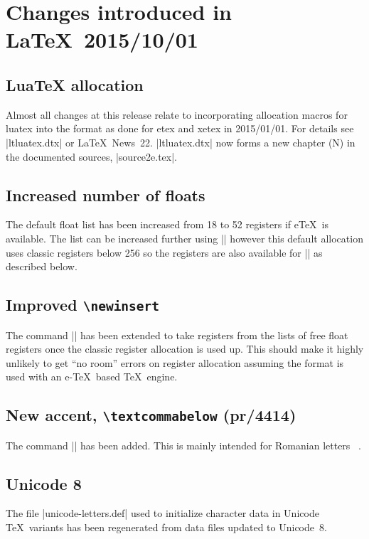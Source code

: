 \documentclass{ltxguide}
\newcommand\ltnewsissue[1]{\LaTeX\ News~#1}
\newcommand\ltnewsissue[1]{%
    \href{https://www.latex-project.org/news/latex2e-news/ltnews#1.pdf}{\LaTeX\ News~#1}}
\begin{document}
\section{Changes  introduced in \LaTeX\ 2015/10/01}

\subsection{LuaTeX allocation}
Almost all changes at this release relate to incorporating allocation macros for luatex into the format
as done for etex and xetex in 2015/01/01. For details see |ltluatex.dtx| or \ltnewsissue{22}.
|ltluatex.dtx| now forms a new chapter (N) in the documented sources, |source2e.tex|.


\subsection{Increased number of floats}
The default float list has been increased from 18 to 52 registers if
e\TeX\ is available.
The list can be increased further using |\extrafloats| however this
default allocation uses classic registers below 256 so the registers are
also available for |\newinsert| as described below.

\subsection{Improved \texttt{\textbackslash newinsert}}
The command |\newinsert| has been extended to take registers from the lists of free float
registers once the classic register allocation is used up. This should make it highly unlikely
to get ``no room'' errors on register allocation assuming the format is used with
an e-\TeX\ based \TeX\ engine.

\subsection{New accent, \texttt{\textbackslash textcommabelow} (pr/4414)}
The command |\textcommabelow| has been added. This is mainly intended for Romanian letters
\,\,\,.

\subsection{Unicode 8}
The file |unicode-letters.def| used to initialize character data in
Unicode \TeX\ variants has been regenerated from data files updated
to Unicode~8.
\end{document}
